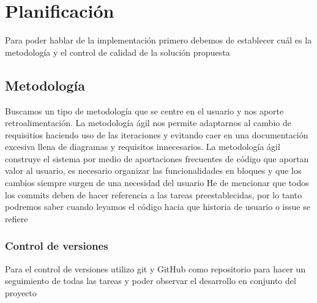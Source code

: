 \chapter{Planificación}

Para poder hablar de la implementación primero debemos de establecer cuál es la metodología y el control de calidad 
de la solución propuesta

\section{Metodología}

Buscamos un tipo de metodología que se centre en el usuario y nos aporte retroalimentación.
La metodología ágil nos permite adaptarnos al cambio de requisitios haciendo uso de las iteraciones y 
evitando caer en una documentación excesiva llena de diagramas y requisitos innecesarios.
La metodología ágil construye el sistema por medio de aportaciones frecuentes de código que aportan valor 
al usuario, es necesario organizar las funcionalidades en bloques y que los cambios siempre surgen de una 
necesidad del usuario
He de mencionar que todos los commits deben de hacer referencia a las tareas preestablecidas, por lo tanto 
podremos saber cuando leyamos el código hacia que historia de usuario o issue se refiere

\subsection{Control de versiones}
Para el control de versiones utilizo git y GitHub como repositorio para hacer un seguimiento de todas las tareas
y poder observar el desarrollo en conjunto del proyecto 

